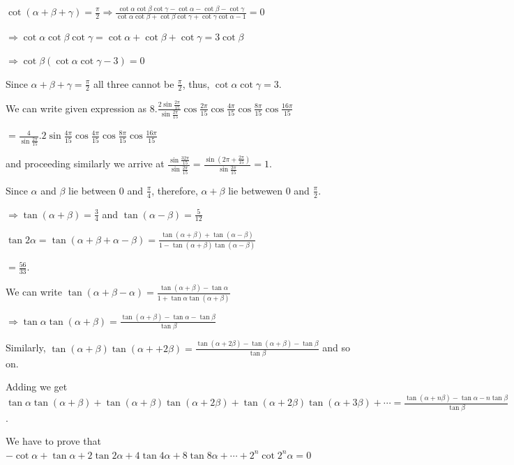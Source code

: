   $\cot(\alpha + \beta + \gamma) = \frac{\pi}{2}\Rightarrow \frac{\cot\alpha\cot\beta\cot\gamma - \cot\alpha
    - \cot\beta - \cot\gamma}{\cot\alpha\cot\beta + \cot\beta\cot\gamma + \cot\gamma\cot\alpha - 1}  = 0$

  $\Rightarrow \cot\alpha\cot\beta\cot\gamma = \cot\alpha + \cot\beta + \cot\gamma = 3\cot\beta$

  $\Rightarrow \cot\beta(\cot\alpha\cot\gamma - 3) = 0$

  Since $\alpha + \beta + \gamma = \frac{\pi}{2}$ all three cannot be $\frac{\pi}{2}$, thus,
  $\cot\alpha\cot\gamma = 3$.
\item We can write given expression as
  $8.\frac{2\sin\frac{2\pi}{15}}{\sin\frac{2\pi}{15}}\cos\frac{2\pi}{15}\cos\frac{4\pi}{15}\cos\frac{8\pi}{15}\cos\frac{16\pi}{15}$

  $= \frac{4}{\sin\frac{2\pi}{15}}.2\sin\frac{4\pi}{15}\cos\frac{4\pi}{15}\cos\frac{8\pi}{15}\cos\frac{16\pi}{15}$

  and proceeding similarly we arrive at $\frac{\sin\frac{32\pi}{15}}{\sin\frac{2\pi}{15}}
  = \frac{\sin\left(2\pi + \frac{2\pi}{15}\right)}{\sin\frac{2\pi}{15}} = 1$.
\item Since $\alpha$ and $\beta$ lie between $0$ and $\frac{\pi}{4}$, therefore, $\alpha + \beta$ lie
  betwewen $0$ and $\frac{\pi}{2}$.

  $\Rightarrow \tan(\alpha + \beta) = \frac{3}{4}$ and $\tan(\alpha - \beta) = \frac{5}{12}$

  $\tan2\alpha = \tan(\alpha + \beta + \alpha - \beta) = \frac{\tan(\alpha + \beta) + \tan(\alpha
    - \beta)}{1 - \tan(\alpha + \beta)\tan(\alpha - \beta)}$

  $= \frac{56}{33}$.
\item We can write $\tan(\alpha + \beta - \alpha) = \frac{\tan(\alpha + \beta) - \tan\alpha}{1
  + \tan\alpha\tan(\alpha + \beta)}$

  $\Rightarrow \tan\alpha\tan(\alpha + \beta) = \frac{\tan(\alpha + \beta) - \tan\alpha
  - \tan\beta}{\tan\beta}$

  Similarly, $\tan(\alpha+ \beta)\tan(\alpha+ + 2\beta) = \frac{\tan(\alpha + 2\beta) - \tan(\alpha + \beta)
    - \tan\beta}{\tan\beta}$ and so on.

  Adding we get $\tan\alpha\tan(\alpha + \beta) + \tan(\alpha + \beta)\tan(\alpha + 2\beta)
  + \tan(\alpha + 2\beta)\tan(\alpha + 3\beta) + \cdots = \frac{\tan(\alpha + n\beta) - \tan\alpha -
    n\tan\beta}{\tan\beta}$.
\item We have to prove that $-\cot\alpha + \tan\alpha + 2\tan2\alpha + 4\tan4\alpha + 8\tan8\alpha + \cdots
  + 2^n\cot2^n\alpha = 0$

